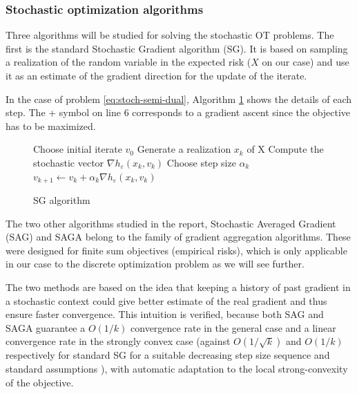 \subsubsection{Stochastic optimization algorithms} \label{section:stoch-opti-algo}
Three algorithms will be studied for solving the stochastic OT problems. The first is the standard Stochastic Gradient algorithm (SG). It is based on sampling a realization of the random variable in the expected risk ($X$ on our case) and use it as an estimate of the gradient direction for the update of the iterate. 

In the case of problem \eqref{eq:stoch-semi-dual}, Algorithm \ref{alg:sg} shows the details of each step. The + symbol on line 6 corresponds to a gradient ascent since the objective has to be maximized.

\begin{figure}[htb]
    \centering
    \begin{minipage}{.8\linewidth}
    \begin{algorithm}[H]
        \caption{SG algorithm}\label{alg:sg}
        \begin{algorithmic}[1]
            \State Choose initial iterate $v_0$
                \State Generate a realization $x_k$ of X
                \State Compute the stochastic vector $\nabla h_\varepsilon(x_k, v_k)$
                \State Choose step size $\alpha_k$
                \State $v_{k+1} \gets v_k + \alpha_k \nabla h_\varepsilon(x_k, v_k)$
            \EndFor
        \end{algorithmic}
    \end{algorithm}
\end{minipage}
\end{figure}


The two other algorithms studied in the report, Stochastic Averaged Gradient (SAG) \cite{schmidt_minimizing_2013} and SAGA \cite{defazio_saga:_2014} belong to the family of gradient aggregation algorithms. These were designed for finite sum objectives (empirical risks), which is only applicable in our case to the discrete optimization problem as we will see further.

The two methods are based on the idea that keeping a history of past gradient in a stochastic context could give better estimate of the real gradient and thus ensure faster convergence. This intuition is verified, because both SAG and SAGA guarantee a $O(1/k)$ convergence rate in the general case and a linear convergence rate in the strongly convex case \cite{schmidt_minimizing_2013,defazio_saga:_2014}(against $O(1/\sqrt{k})$ and $O(1/k)$ respectively for standard SG for a suitable decreasing step size sequence and standard assumptions \cite{nemirovski_robust_2009}), with automatic adaptation to the local strong-convexity of the objective.


